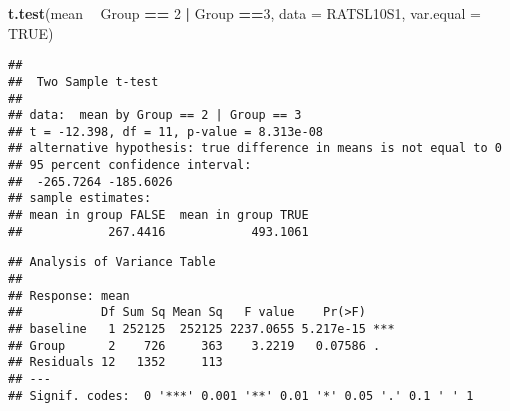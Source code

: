 \documentclass[]{article}
\newenvironment{Shaded}{\begin{snugshade}}{\end{snugshade}}
\newcommand{\KeywordTok}[1]{\textcolor[rgb]{0.13,0.29,0.53}{\textbf{#1}}}
\newcommand{\DataTypeTok}[1]{\textcolor[rgb]{0.13,0.29,0.53}{#1}}
\newcommand{\DecValTok}[1]{\textcolor[rgb]{0.00,0.00,0.81}{#1}}
\newcommand{\CharTok}[1]{\textcolor[rgb]{0.31,0.60,0.02}{#1}}
\newcommand{\StringTok}[1]{\textcolor[rgb]{0.31,0.60,0.02}{#1}}
\newcommand{\CommentTok}[1]{\textcolor[rgb]{0.56,0.35,0.01}{\textit{#1}}}
\newcommand{\OtherTok}[1]{\textcolor[rgb]{0.56,0.35,0.01}{#1}}
\newcommand{\OperatorTok}[1]{\textcolor[rgb]{0.81,0.36,0.00}{\textbf{#1}}}
\newcommand{\NormalTok}[1]{#1}
\begin{document}
\begin{Shaded}
\begin{Highlighting}[]
\KeywordTok{t.test}\NormalTok{(mean }\OperatorTok{~}\StringTok{ }\NormalTok{Group }\OperatorTok{==}\StringTok{ }\DecValTok{2}  \OperatorTok{|}\StringTok{ }\NormalTok{Group }\OperatorTok{==}\DecValTok{3}\NormalTok{, }\DataTypeTok{data =}\NormalTok{ RATSL10S1, }\DataTypeTok{var.equal =} \OtherTok{TRUE}\NormalTok{)}
\end{Highlighting}
\end{Shaded}

\begin{verbatim}
## 
##  Two Sample t-test
## 
## data:  mean by Group == 2 | Group == 3
## t = -12.398, df = 11, p-value = 8.313e-08
## alternative hypothesis: true difference in means is not equal to 0
## 95 percent confidence interval:
##  -265.7264 -185.6026
## sample estimates:
## mean in group FALSE  mean in group TRUE 
##            267.4416            493.1061
\end{verbatim}

\begin{Shaded}
\end{Shaded}

\begin{verbatim}
## Analysis of Variance Table
## 
## Response: mean
##           Df Sum Sq Mean Sq   F value    Pr(>F)    
## baseline   1 252125  252125 2237.0655 5.217e-15 ***
## Group      2    726     363    3.2219   0.07586 .  
## Residuals 12   1352     113                        
## ---
## Signif. codes:  0 '***' 0.001 '**' 0.01 '*' 0.05 '.' 0.1 ' ' 1
\end{verbatim}
\end{document}
